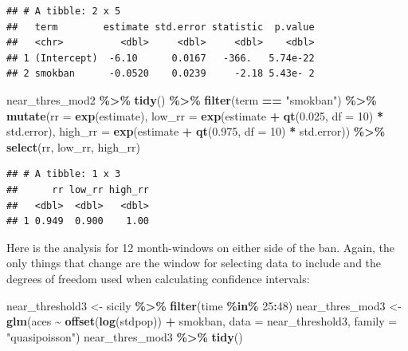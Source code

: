 \documentclass[
]{book}
\newenvironment{Shaded}{\begin{snugshade}}{\end{snugshade}}
\newcommand{\AttributeTok}[1]{\textcolor[rgb]{0.13,0.29,0.53}{#1}}
\newcommand{\DecValTok}[1]{\textcolor[rgb]{0.00,0.00,0.81}{#1}}
\newcommand{\FloatTok}[1]{\textcolor[rgb]{0.00,0.00,0.81}{#1}}
\newcommand{\FunctionTok}[1]{\textcolor[rgb]{0.13,0.29,0.53}{\textbf{#1}}}
\newcommand{\NormalTok}[1]{#1}
\newcommand{\OtherTok}[1]{\textcolor[rgb]{0.56,0.35,0.01}{#1}}
\newcommand{\SpecialCharTok}[1]{\textcolor[rgb]{0.81,0.36,0.00}{\textbf{#1}}}
\newcommand{\StringTok}[1]{\textcolor[rgb]{0.31,0.60,0.02}{#1}}
\begin{document}
\begin{verbatim}
## # A tibble: 2 x 5
##   term        estimate std.error statistic  p.value
##   <chr>          <dbl>     <dbl>     <dbl>    <dbl>
## 1 (Intercept)  -6.10      0.0167   -366.   5.74e-22
## 2 smokban      -0.0520    0.0239     -2.18 5.43e- 2
\end{verbatim}

\begin{Shaded}
\begin{Highlighting}[]
\NormalTok{near\_thres\_mod2 }\SpecialCharTok{\%\textgreater{}\%} 
  \FunctionTok{tidy}\NormalTok{() }\SpecialCharTok{\%\textgreater{}\%} 
  \FunctionTok{filter}\NormalTok{(term }\SpecialCharTok{==} \StringTok{"smokban"}\NormalTok{) }\SpecialCharTok{\%\textgreater{}\%} 
  \FunctionTok{mutate}\NormalTok{(}\AttributeTok{rr =} \FunctionTok{exp}\NormalTok{(estimate), }
         \AttributeTok{low\_rr =} \FunctionTok{exp}\NormalTok{(estimate }\SpecialCharTok{+} \FunctionTok{qt}\NormalTok{(}\FloatTok{0.025}\NormalTok{, }\AttributeTok{df =} \DecValTok{10}\NormalTok{) }\SpecialCharTok{*}\NormalTok{ std.error), }
         \AttributeTok{high\_rr =} \FunctionTok{exp}\NormalTok{(estimate }\SpecialCharTok{+} \FunctionTok{qt}\NormalTok{(}\FloatTok{0.975}\NormalTok{, }\AttributeTok{df =} \DecValTok{10}\NormalTok{) }\SpecialCharTok{*}\NormalTok{ std.error)) }\SpecialCharTok{\%\textgreater{}\%} 
  \FunctionTok{select}\NormalTok{(rr, low\_rr, high\_rr)}
\end{Highlighting}
\end{Shaded}

\begin{verbatim}
## # A tibble: 1 x 3
##      rr low_rr high_rr
##   <dbl>  <dbl>   <dbl>
## 1 0.949  0.900    1.00
\end{verbatim}

Here is the analysis for 12 month-windows
on either side of the ban. Again, the only things that change are the window for selecting data to include and the degrees of freedom used when calculating confidence intervals:

\begin{Shaded}
\begin{Highlighting}[]
\NormalTok{near\_threshold3 }\OtherTok{\textless{}{-}}\NormalTok{ sicily }\SpecialCharTok{\%\textgreater{}\%} 
  \FunctionTok{filter}\NormalTok{(time }\SpecialCharTok{\%in\%} \DecValTok{25}\SpecialCharTok{:}\DecValTok{48}\NormalTok{)}
\NormalTok{near\_thres\_mod3 }\OtherTok{\textless{}{-}} \FunctionTok{glm}\NormalTok{(aces }\SpecialCharTok{\textasciitilde{}} \FunctionTok{offset}\NormalTok{(}\FunctionTok{log}\NormalTok{(stdpop)) }\SpecialCharTok{+}\NormalTok{ smokban, }
                      \AttributeTok{data =}\NormalTok{ near\_threshold3, }
                      \AttributeTok{family =} \StringTok{"quasipoisson"}\NormalTok{)}
\NormalTok{near\_thres\_mod3 }\SpecialCharTok{\%\textgreater{}\%} 
  \FunctionTok{tidy}\NormalTok{()}
\end{Highlighting}
\end{Shaded}
\end{document}
